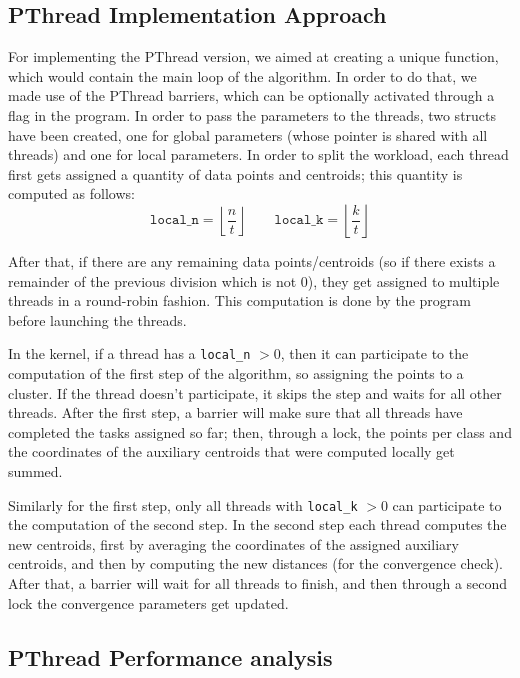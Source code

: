 \documentclass[11pt, journal]{IEEEtran}
\newcommand{\nwl}{

\vspace{11pt}

}
\begin{document}
\subsection{PThread Implementation Approach}

For implementing the PThread version, we aimed at creating a unique function, which would contain the main loop of the algorithm. In order to do that, we made use of the PThread barriers, which can be optionally activated through a flag in the program. In order to pass the parameters to the threads, two structs have been created, one for global parameters (whose pointer is shared with all threads) and one for local parameters. In order to split the workload, each thread first gets assigned a quantity of data points and centroids; this quantity is computed as follows:
\[ \texttt{local\_n} = \left\lfloor \frac{n}{t} \right\rfloor \quad \quad \texttt{local\_k} = \left\lfloor \frac{k}{t} \right\rfloor \]

After that, if there are any remaining data points/centroids (so if there exists a remainder of the previous division which is not 0), they get assigned to multiple threads in a round-robin fashion. This computation is done by the program before launching the threads.
\nwl
In the kernel, if a thread has a \verb|local_n| $> 0$, then it can participate to the computation of the first step of the algorithm, so assigning the points to a cluster. If the thread doesn't participate, it skips the step and waits for all other threads. After the first step, a barrier will make sure that all threads have completed the tasks assigned so far; then, through a lock, the points per class and the coordinates of the auxiliary centroids that were computed locally get summed.
\nwl
Similarly for the first step, only all threads with \verb|local_k| $> 0$ can participate to the computation of the second step. In the second step each thread computes the new centroids, first by averaging the coordinates of the assigned auxiliary centroids, and then by computing the new distances (for the convergence check). After that, a barrier will wait for all threads to finish, and then through a second lock the convergence parameters get updated. 

\subsection{PThread Performance analysis}
\end{document}
